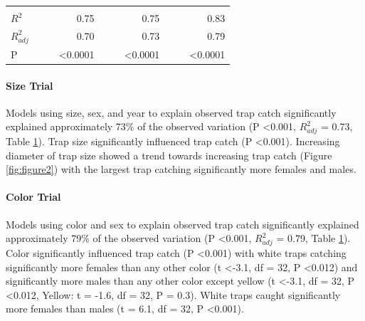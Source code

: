 \documentclass[alpha-refs]{wiley-article}
\begin{document}
\begin{table}[]
\begin{tabular}{lrrrrrrrrr}
              &                       &                        &                       &                       &                        &                       &                       &                        &                       \\
$R^2$            &                       &                        & 0.75                  &                       &                        & 0.75                  &                       &                        & 0.83                  \\
$R^2_{adj}$         &                       &                        & 0.70                  &                       &                        & 0.73                  &                       &                        & 0.79                  \\
P             &                       &                        & \textless 0.0001      &                       &                        & \textless 0.0001      &                       &                        & \textless 0.0001     
\end{tabular}
\label{table:1}
\end{table}



\paragraph{Size Trial} Models using size, sex, and year to explain observed trap catch significantly explained approximately 73\% of the observed variation (P \textless 0.001, $R^2_{adj}$ = 0.73, Table \ref{table:1}).  Trap size significantly influenced trap catch (P \textless 0.001).  Increasing diameter of trap size showed a trend towards increasing trap catch (Figure \ref{fig:figure2}) with the largest trap catching significantly more females and males.


\paragraph{Color Trial} Models using color and sex to explain observed trap catch significantly explained approximately 79\% of the observed variation (P \textless 0.001, $R^2_{adj}$ = 0.79, Table \ref{table:1}). Color significantly influenced trap catch (P \textless 0.001) with white traps catching significantly more females than any other color (t \textless -3.1, df = 32, P \textless 0.012) and significantly more males than any other color except yellow (t \textless -3.1, df = 32, P \textless 0.012, Yellow: t = -1.6, df = 32, P = 0.3).  White traps caught significantly more females than males (t = 6.1, df = 32, P \textless 0.001).
\end{document}
